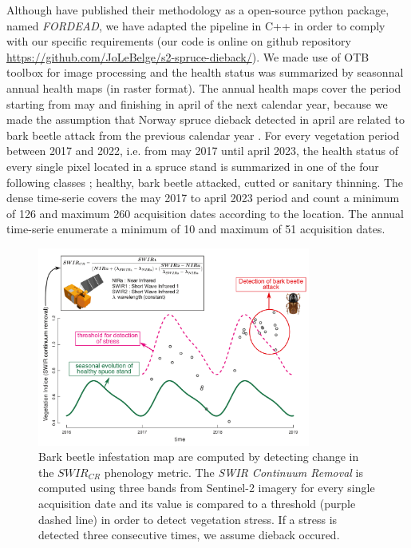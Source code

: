 \documentclass[3p,procedia]{elsarticle}
\begin{document}
Although \cite{dutrieux_package_2021} have published their methodology as a open-source python package, named \textit{FORDEAD}, we have adapted the pipeline in C++ in order to comply with our specific requirements (our code is online on github repository \url{https://github.com/JoLeBelge/s2-spruce-dieback/}). 
We made use of OTB toolbox \citep{grizonnet_2017_OTB} for image processing and the health status was summarized by seasonnal annual health maps (in raster format).
The annual health maps cover the period starting from may and finishing in april of the next calendar year, because we made the assumption that Norway spruce dieback detected in april are related to bark beetle attack from the previous calendar year \citep{muller_features_2022}.
For every vegetation period between 2017 and 2022, i.e. from may 2017 until april 2023, the health status of every single pixel located in a spruce stand is summarized in one of the four following classes ; healthy, bark beetle attacked, cutted or sanitary thinning.
The dense time-serie covers the may 2017 to april 2023 period and count a minimum of 126 and maximum 260 acquisition dates according to the location. 
The annual time-serie enumerate a minimum of 10 and maximum of 51 acquisition dates.

\begin{figure}[htbp] 
	\centering
	\includegraphics[width=0.8\textwidth]{fctHarmo.png}
	\caption{Bark beetle infestation map are computed by detecting change in the $SWIR_{CR}$ phenology metric. The \textit{SWIR Continuum Removal} is computed using three bands from Sentinel-2 imagery for every single acquisition date and its value is compared to a threshold (purple dashed line) in order to detect vegetation stress. If a stress is detected three consecutive times, we assume dieback occured.}
	\label{fig:harmo}
\end{figure}
\end{document}
